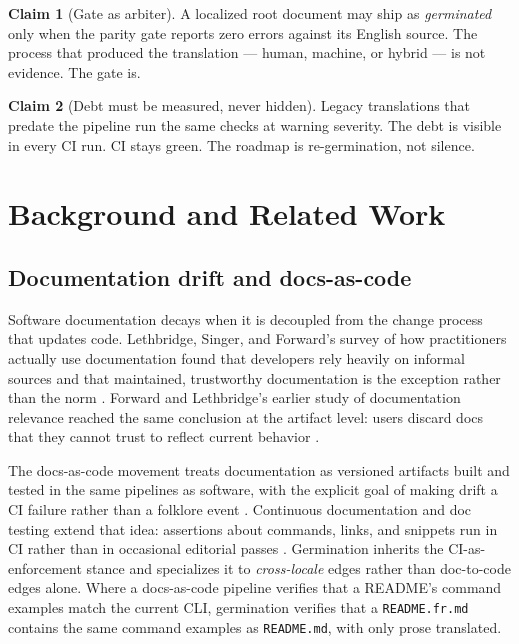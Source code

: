 \documentclass[11pt]{article}
\theoremstyle{definition}
\newtheorem{claim}{Claim}
\theoremstyle{plain}
\theoremstyle{remark}
\begin{document}
\begin{claim}[Gate as arbiter]
\label{cl:gate-arbiter}
A localized root document may ship as \emph{germinated} only when the parity
gate reports zero errors against its English source. The process that
produced the translation --- human, machine, or hybrid --- is not evidence.
The gate is.
\end{claim}

\begin{claim}[Debt must be measured, never hidden]
\label{cl:debt-enforced}
Legacy translations that predate the pipeline run the same checks at warning
severity. The debt is visible in every CI run. CI stays green. The roadmap is
re-germination, not silence.
\end{claim}



\section{Background and Related Work}
\label{sec:related}

\subsection{Documentation drift and docs-as-code}

Software documentation decays when it is decoupled from the change process
that updates code. Lethbridge, Singer, and Forward's survey of how
practitioners actually use documentation found that developers rely heavily
on informal sources and that maintained, trustworthy documentation is the
exception rather than the norm \citep{lethbridge2003}. Forward and
Lethbridge's earlier study of documentation relevance reached the same
conclusion at the artifact level: users discard docs that they cannot trust
to reflect current behavior \citep{forward2002}.

The docs-as-code movement treats documentation as versioned artifacts built
and tested in the same pipelines as software, with the explicit goal of
making drift a CI failure rather than a folklore event
\citep{docsascode,writethedocs}. Continuous documentation and doc testing
extend that idea: assertions about commands, links, and snippets run in CI
rather than in occasional editorial passes \citep{prettydocs}. Germination
inherits the CI-as-enforcement stance and specializes it to
\emph{cross-locale} edges rather than doc-to-code edges alone. Where a
docs-as-code pipeline verifies that a README's command examples match the
current CLI, germination verifies that a \texttt{README.fr.md} contains the
same command examples as \texttt{README.md}, with only prose translated.
\end{document}
